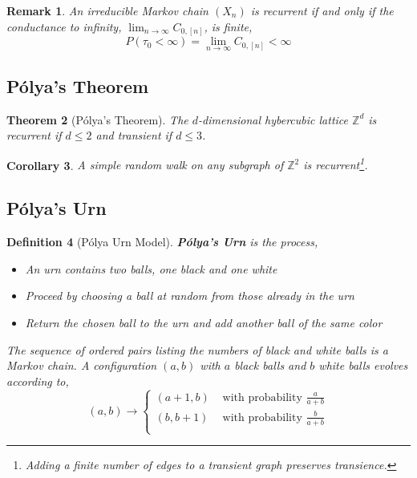 \documentclass{tufte-handout}
\newtheorem{thm}{Theorem}
\newtheorem{cor}[thm]{Corollary}
\newtheorem{defn}[thm]{Definition}
\newtheorem{rmk}[thm]{Remark}
\begin{document}
  \begin{rmk}
    An irreducible Markov chain $(X_n)$ is recurrent if and only if the conductance to infinity, $\lim_{n \rightarrow \infty} C_{0, [n]}$, is finite,
    \[P(\tau_0 < \infty) = \lim_{n \rightarrow \infty} C_{0, [n]} < \infty\]
  \end{rmk}

  \subsection{P\'{o}lya's Theorem}
  \begin{thm}[P\'{o}lya's Theorem]
    The $d$-dimensional hybercubic lattice $\mathbb{Z}^d$ is recurrent if $d \leq 2$ and transient if $d \leq 3$.
  \end{thm}

  \begin{cor}
    A simple random walk on any subgraph of $\mathbb{Z}^2$ is recurrent\footnote{Adding a finite number of edges to a transient graph preserves transience.}.
  \end{cor}

  \subsection{P\'{o}lya's Urn}
  \begin{defn}[P\'{o}lya Urn Model]
    \textbf{P\'{o}lya's Urn} is the process,
    \begin{itemize}
      \item An urn contains two balls, one black and one white
      \item Proceed by choosing a ball at random from those already in the urn
      \item Return the chosen ball to the urn and add another ball of the same color
    \end{itemize}
    \noindent The sequence of ordered pairs listing the numbers of black and white balls is a Markov chain. A configuration $(a, b)$ with $a$ black balls and $b$ white balls evolves according to,
    \[(a,b) \rightarrow \begin{cases}
      (a+1, b) & \text{ with probability $\frac{a}{a+b}$} \\
      (b, b+1) & \text{ with probability $\frac{b}{a+b}$} \\
    \end{cases}\]
  \end{defn}
\end{document}
